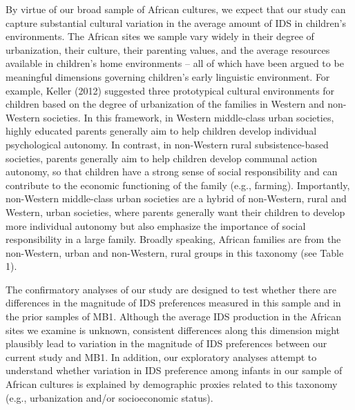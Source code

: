 \documentclass[
  english,
  ,man,floatsintext]{apa6}
\begin{document}
By virtue of our broad sample of African cultures, we expect that our study can capture substantial cultural variation in the average amount of IDS in children's environments. The African sites we sample vary widely in their degree of urbanization, their culture, their parenting values, and the average resources available in children's home environments -- all of which have been argued to be meaningful dimensions governing children's early linguistic environment. For example, Keller (2012) suggested three prototypical cultural environments for children based on the degree of urbanization of the families in Western and non-Western societies. In this framework, in Western middle-class urban societies, highly educated parents generally aim to help children develop individual psychological autonomy. In contrast, in non-Western rural subsistence-based societies, parents generally aim to help children develop communal action autonomy, so that children have a strong sense of social responsibility and can contribute to the economic functioning of the family (e.g., farming). Importantly, non-Western middle-class urban societies are a hybrid of non-Western, rural and Western, urban societies, where parents generally want their children to develop more individual autonomy but also emphasize the importance of social responsibility in a large family. Broadly speaking, African families are from the non-Western, urban and non-Western, rural groups in this taxonomy (see Table 1).

The confirmatory analyses of our study are designed to test whether there are differences in the magnitude of IDS preferences measured in this sample and in the prior samples of MB1. Although the average IDS production in the African sites we examine is unknown, consistent differences along this dimension might plausibly lead to variation in the magnitude of IDS preferences between our current study and MB1. In addition, our exploratory analyses attempt to understand whether variation in IDS preference among infants in our sample of African cultures is explained by demographic proxies related to this taxonomy (e.g., urbanization and/or socioeconomic status).
\end{document}
